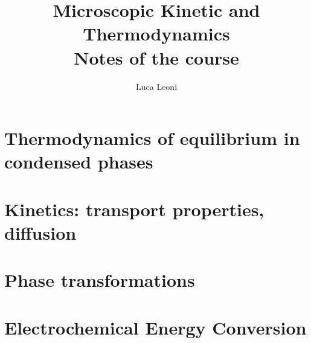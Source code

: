 \documentclass[12pt]{report}
\title{\Huge{Microscopic Kinetic and Thermodynamics}\\Notes of the course}
\author{\huge{Luca Leoni}}
\date{}
\begin{document}
    \maketitle

    \tableofcontents

    \chapter{Thermodynamics of equilibrium in condensed phases}
    
    
    
    

    \chapter{Kinetics: transport properties, diffusion}
    
    
    
    

    \chapter{Phase transformations}
    
    

    \chapter{Electrochemical Energy Conversion}
    
    
\end{document}
